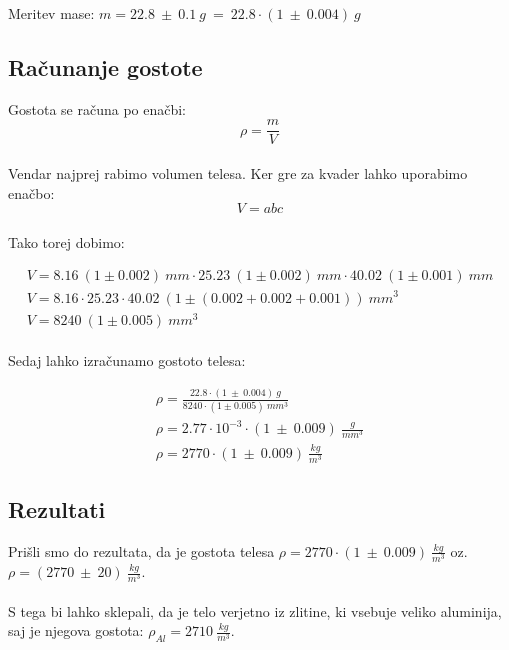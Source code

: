 \documentclass{report}
\begin{document}
Meritev mase: $m = 22.8 \ \pm \ 0.1\ g \ = \ 22.8 \cdot (1 \ \pm \ 0.004)\ g$

\pagebreak

\subsection{Računanje gostote}

Gostota se računa po enačbi:
\begin{equation}
  \rho = \frac{m}{V}
\end{equation}
\\
Vendar najprej rabimo volumen telesa. Ker gre za kvader lahko uporabimo enačbo:
\begin{equation}
  V = abc
\end{equation}
\\
Tako torej dobimo:

\begin{equation}
  \label{eq:1}
  \begin{gathered}
    V = 8.16 \ (1 \pm 0.002)\ mm \cdot 25.23 \ (1 \pm 0.002)\ mm \cdot 40.02 \ (1 \pm 0.001)\ mm\\
    V = 8.16 \cdot 25.23 \cdot 40.02 \ (1 \pm (0.002 + 0.002 + 0.001))\ mm^3\\
    V = 8240 \ (1 \pm 0.005) \ mm^3
  \end{gathered}
\end{equation}
\\
Sedaj lahko izračunamo gostoto telesa:

\begin{equation}
  \label{eq:1}
  \begin{gathered}
    \rho = \frac{22.8 \cdot (1 \ \pm \ 0.004)\ g}{8240 \cdot (1 \pm 0.005) \ mm^3} \\
    \rho = 2.77 \cdot 10^{-3} \cdot (1 \ \pm \ 0.009) \ \frac{g}{mm^3} \\
    \rho = 2770 \cdot (1 \ \pm \ 0.009) \ \frac{kg}{m^3}
  \end{gathered}
\end{equation}

\subsection{Rezultati}
Prišli smo do rezultata, da je gostota telesa $\rho = 2770 \cdot (1 \ \pm \ 0.009) \ \frac{kg}{m^3}$ oz. 
$\rho = (2770 \ \pm \ 20) \ \frac{kg}{m^3}$.
\\\\
S tega bi lahko sklepali, da je telo verjetno iz zlitine, ki vsebuje veliko aluminija, saj je njegova gostota: 
$\rho_{Al} = 2710 \ \frac{kg}{m^3}$.
\end{document}
